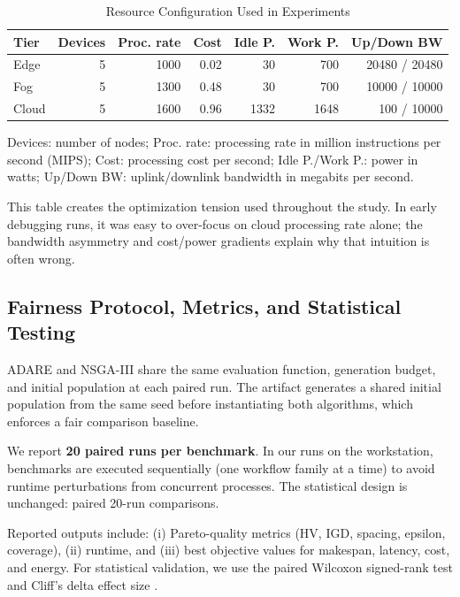 \documentclass[runningheads]{llncs}
\begin{document}
\begin{table}[H]
\caption{Resource Configuration Used in Experiments}
\label{tab:envjson}
\centering
\small
\begin{tabular*}{\textwidth}{@{\extracolsep{\fill}}lrrrrrr@{}}
\toprule
Tier & Devices & Proc. rate & Cost & Idle P. & Work P. & Up/Down BW \\
\midrule
Edge & 5 & 1000 & 0.02 & 30 & 700 & 20480 / 20480 \\
Fog & 5 & 1300 & 0.48 & 30 & 700 & 10000 / 10000 \\
Cloud & 5 & 1600 & 0.96 & 1332 & 1648 & 100 / 10000 \\
\bottomrule
\end{tabular*}
\vspace{0.3ex}
\begin{minipage}{\textwidth}
\footnotesize Devices: number of nodes; Proc. rate: processing rate in million instructions per second (MIPS); Cost: processing cost per second; Idle P./Work P.: power in watts; Up/Down BW: uplink/downlink bandwidth in megabits per second.
\end{minipage}
\end{table}

This table creates the optimization tension used throughout the study. In early debugging runs, it was easy to over-focus on cloud processing rate alone; the bandwidth asymmetry and cost/power gradients explain why that intuition is often wrong.

\subsection{Fairness Protocol, Metrics, and Statistical Testing}
ADARE and NSGA-III share the same evaluation function, generation budget, and initial population at each paired run. The artifact generates a shared initial population from the same seed before instantiating both algorithms, which enforces a fair comparison baseline.

We report \textbf{20 paired runs per benchmark}. In our runs on the workstation, benchmarks are executed sequentially (one workflow family at a time) to avoid runtime perturbations from concurrent processes. The statistical design is unchanged: paired 20-run comparisons.

Reported outputs include: (i) Pareto-quality metrics (HV, IGD, spacing, epsilon, coverage), (ii) runtime, and (iii) best objective values for makespan, latency, cost, and energy. For statistical validation, we use the paired Wilcoxon signed-rank test and Cliff's delta effect size \cite{wilcoxon1945,cliff1993}.
\end{document}
